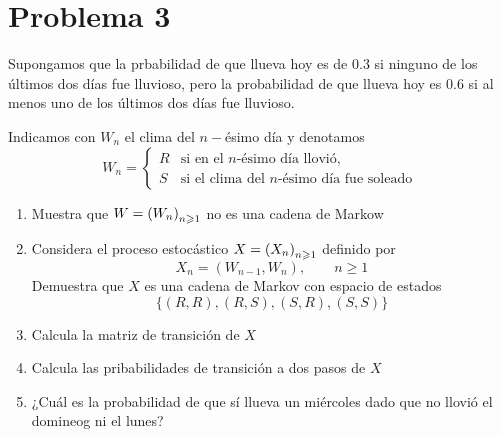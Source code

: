 \documentclass[a4paper,12pt]{article}
\begin{document}
\section{Problema 3}
\begin{displayquote}
    Supongamos que la prbabilidad de que llueva hoy es de $0.3$ si ninguno de los últimos dos días fue lluvioso, pero la probabilidad de que llueva hoy es $0.6$ si al menos uno de los últimos dos días fue lluvioso.
    \par Indicamos con $W_n$ el clima del $n-$ésimo día y denotamos
    \[W_n=\begin{cases}
        R& \text{si en el $n$-ésimo día llovió,}\\
        S& \text{si el clima del $n$-ésimo día fue soleado}
    \end{cases}\]
    \begin{enumerate}
        \item Muestra que $W=\cdm{W_n}$ no es una cadena de Markow
        \item Considera el proceso estocástico $X=\cdm{X_n}$ definido por
        \[X_n= (W_{n-1},W_n),\qquad n\geqslant 1\]
        Demuestra que $X$ es una cadena de Markov con espacio de estados 
        \[\{(R,R),(R,S),(S,R),(S,S)\}\]
        \item Calcula la matriz de transición de $X$
        \item Calcula las pribabilidades de transición a dos pasos de $X$
        \item ¿Cuál es la probabilidad de que sí llueva un miércoles dado que no llovió el domineog ni el lunes?
    \end{enumerate}
\end{displayquote}
\end{document}
